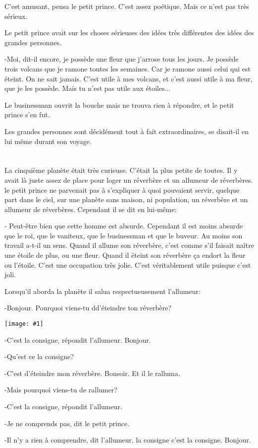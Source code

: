 \documentclass{report}
\newcommand{\parachapter}[2][]{\chapter[#1]{#2}}
\newcommand{\incpic}[1]{%
\begin{center}
    \texttt{[image: \#1]}
\end{center}%
}
\begin{document}
C'est amusant, pensa le petit prince. C'est assez poétique. Mais ce n'est pas très sérieux.

Le petit prince avait sur les choses sérieuses des idées très différentes des idées des grandes personnes.

-Moi, dit-il encore, je possède une fleur que j'arrose tous les jours. Je possède trois volcans que je ramone toutes les semaines. Car je ramone aussi celui qui est éteint. On ne sait jamais. C'est utile à mes volcans, et c'est aussi utile à ma fleur, que je les possède. Mais tu n'est pas utile aux étoiles...

Le businessman ouvrit la bouche mais ne trouva rien à répondre, et le petit prince s'en fut.

Les grandes personnes sont décidément tout à fait extraordinaires, se disait-il en lui même durant son voyage.

\parachapter{} %
La cinquième planète était très curieuse. C'était la plus petite de toutes. Il y avait là juste assez de place pour loger un réverbère et un allumeur de réverbères. le petit prince ne parvenait pas à s'expliquer à quoi pouvaient servir, quelque part dans le ciel, sur une planète sans maison, ni population, un réverbère et un allumeur de réverbères. Cependant il se dit en lui-même:

- Peut-être bien que cette homme est absurde. Cependant il est moins absurde que le roi, que le vaniteux, que le businessman et que le buveur. Au moins son travail a-t-il un sens. Quand il allume son réverbère, c'est comme s'il faisait naître une étoile de plus, ou une fleur. Quand il éteint son réverbère ça endort la fleur ou l'étoile. C'est une occupation très jolie. C'est véritablement utile puisque c'est joli.

Lorsqu'il aborda la planète il salua respectueusement l'allumeur:

-Bonjour. Pourquoi viens-tu dd'éteindre ton réverbère?
\incpic{pic/image29.jpeg}
-C'est la consigne, répondit l'allumeur. Bonjour.

-Qu'est ce la consigne?

-C'est d'éteindre mon réverbère. Bonsoir.
Et il le ralluma.

-Mais pourquoi viens-tu de rallumer?

-C'est la consigne, répondit l'allumeur.

-Je ne comprends pas, dit le petit prince.

-Il n'y a rien à comprendre, dit l'allumeur. la consigne c'est la consigne. Bonjour.
\end{document}
